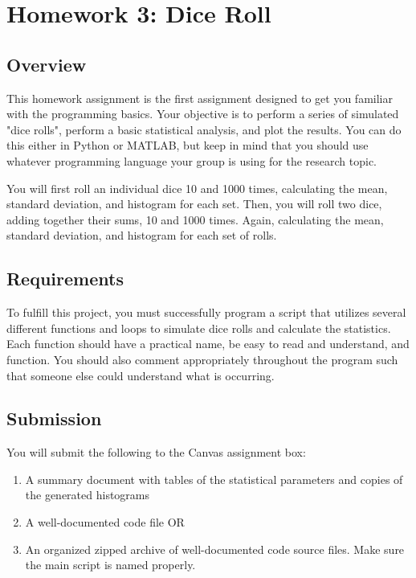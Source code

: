 \documentclass[
	letterpaper, %
	fontsize=10pt, %
	twoside=true, %
	numbers=noenddot, %
]{kaobook}
\begin{document}
\chapter*{Homework 3: Dice Roll}

\section*{Overview}
This homework assignment is the first assignment designed to get you familiar with the programming basics.
Your objective is to perform a series of simulated "dice rolls", perform a basic statistical analysis, and plot the results.
You can do this either in Python or MATLAB, but keep in mind that you should use whatever programming language your group is using for the research topic. 

You will first roll an individual dice 10 and 1000 times, calculating the mean, standard deviation, and histogram for each set.
Then, you will roll two dice, adding together their sums, 10 and 1000 times.
Again, calculating the mean, standard deviation, and histogram for each set of rolls.

\section*{Requirements}
To fulfill this project, you must successfully program a script that utilizes several different functions and loops to simulate dice rolls and calculate the statistics.
Each function should have a practical name, be easy to read and understand, and function.
You should also comment appropriately throughout the program such that someone else could understand what is occurring.

\section*{Submission}
You will submit the following to the Canvas assignment box:
\begin{enumerate}
    \item A summary document with tables of the statistical parameters and copies of the generated histograms
    \item A well-documented code file OR
    \item An organized zipped archive of well-documented code source files. Make sure the main script is named properly.
\end{enumerate}
\end{document}
